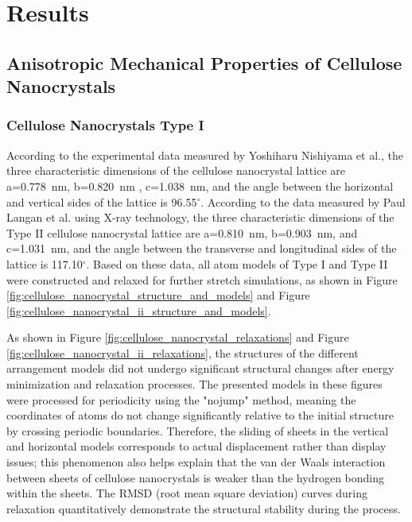 \documentclass{article}
\begin{document}
\section*{Results}
\addtocounter{section}{1}
\setcounter{subsection}{0}
\indent

\subsection{Anisotropic Mechanical Properties of Cellulose Nanocrystals}\indent

\subsubsection{Cellulose Nanocrystals Type I}\indent

According to the experimental data measured by Yoshiharu Nishiyama et al.\cite{nishiyama2002crystal}, the three characteristic dimensions of the cellulose nanocrystal lattice are a=0.778~nm, b=0.820~nm , c=1.038~nm, and the angle between the horizontal and vertical sides of the lattice is 96.55$^\circ$.
According to the data measured by Paul Langan et al. using X-ray technology\cite{langan2001x}, the three characteristic dimensions of the Type II cellulose nanocrystal lattice are a=0.810~nm, b=0.903~nm, and c=1.031~nm, and the angle between the transverse and longitudinal sides of the lattice is 117.10$^{\circ}$.
Based on these data, all atom models of Type I and Type II were constructed and relaxed for further stretch simulations, as shown in Figure \ref{fig:cellulose_nanocrystal_structure_and_models} and Figure \ref{fig:cellulose_nanocrystal_ii_structure_and_models}.

As shown in Figure \ref{fig:cellulose_nanocrystal_relaxations} and Figure \ref{fig:cellulose_nanocrystal_ii_relaxations}, the structures of the different arrangement models did not undergo significant structural changes after energy minimization and relaxation processes.
The presented models in these figures were processed for periodicity using the "nojump" method, meaning the coordinates of atoms do not change significantly relative to the initial structure by crossing periodic boundaries.
Therefore, the sliding of sheets in the vertical and horizontal models corresponds to actual displacement rather than display issues; this phenomenon also helps explain that the van der Waals interaction between sheets of cellulose nanocrystals is weaker than the hydrogen bonding within the sheets.
The RMSD (root mean square deviation) curves during relaxation quantitatively demonstrate the structural stability during the process.
\end{document}
